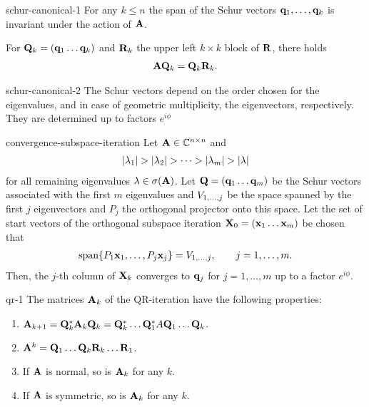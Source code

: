 \begin{Lemma}{schur-canonical-1}
  For any $k\le n$ the span of the Schur vectors
  $\mathbf q_1,\dots,\mathbf q_k$ is invariant under the action of $\mathbf A$.

  For $\mathbf Q_k = (\mathbf q_1\dots\mathbf q_k)$ and $\mathbf R_k$ the upper left $k\times k$ block of $\mathbf R$, there holds
  \begin{gather}
    \mathbf A\mathbf Q_k = \mathbf Q_k \mathbf R_k.
  \end{gather}
\end{Lemma}

\begin{Lemma}{schur-canonical-2}
  The Schur vectors depend on the order chosen for the eigenvalues,
  and in case of geometric multiplicity, the eigenvectors,
  respectively. They are determined up to factors $e^{i\phi}$
\end{Lemma}

\begin{Theorem}{convergence-subspace-iteration}
  Let $\mathbf A\in\mathbb C^{n\times n}$ and
  \begin{gather}
    \lvert\lambda_1\rvert >
    \lvert\lambda_2\rvert>\dots>\lvert\lambda_m\rvert>\lvert\lambda\rvert
  \end{gather}
  for all
  remaining eigenvalues $\lambda\in\sigma(\mathbf A)$. Let
  $\mathbf Q = (\mathbf q_1\dots\mathbf q_m)$ be the Schur vectors associated with the
  first $m$ eigenvalues and $V_{1,\dots,j}$ be the space spanned by
  the first $j$ eigenvectors and $P_j$ the orthogonal projector
  onto this space. Let the set of start vectors of the orthogonal subspace iteration
  $\mathbf X_0 = (\mathbf x_1\dots\mathbf x_m)$ be chosen that
  \begin{gather}
    \operatorname{span}\{P_1 \mathbf x_1,\dots,P_j\mathbf x_j\} = V_{1,\dots,j},\qquad j=1,\dots,m.
  \end{gather}
  Then, the $j$-th column of $\mathbf X_k$ converges to $\mathbf q_j$ for $j=1,\dots,m$ up to a factor $e^{i\phi}$.
\end{Theorem}

\begin{Lemma}{qr-1}
  The matrices $\mathbf A_k$ of the QR-iteration have the following properties:
  \begin{enumerate}
  \item $\mathbf A_{k+1} = \mathbf Q_k^*\mathbf A_k\mathbf Q_k = \mathbf Q_k^*\dots\mathbf Q_1^*A\mathbf Q_1\dots\mathbf Q_k$.
  \item $\mathbf A^k=\mathbf Q_1\dots\mathbf Q_k\mathbf R_k\dots\mathbf R_1$.
  \item If $\mathbf A$ is normal, so is $\mathbf A_k$ for any $k$.
  \item If $\mathbf A$ is symmetric, so is $\mathbf A_k$ for any $k$.
  \end{enumerate}
\end{Lemma}

